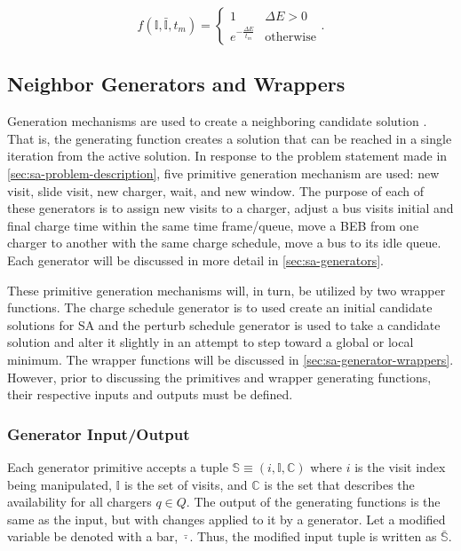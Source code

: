 \documentclass[energies,article,submit,moreauthors]{Definitions/mdpi}
\newcommand{\I}{\mathbb{I}}                 %
\newcommand{\C}{\mathbb{C}}                 %
\newcommand{\Sol}{\mathbb{S}}               %
\newcommand{\Qset}{Q}                       %
\begin{document}
\begin{equation}
\label{eq:candaccept}
f(\I,\bar{\I},t_m) =
\begin{cases}
  1                   & \Delta E > 0 \\
  e^{- \frac{\Delta E}{t_m}} & \text{otherwise}
\end{cases}\text{.}
\end{equation}

\subsection{Neighbor Generators and Wrappers}
\label{sec:sa-generation-mechanisms}
Generation mechanisms are used to create a neighboring candidate solution \cite{gendreau-2018-handb-metah}. That is,
the generating function creates a solution that can be reached in a single iteration from the active solution. In
response to the problem statement made in \ref{sec:sa-problem-description}, five primitive generation mechanism are used: new
visit, slide visit, new charger, wait, and new window. The purpose of each of these generators is to assign new visits
to a charger, adjust a bus visits initial and final charge time within the same time frame/queue, move a BEB from one
charger to another with the same charge schedule, move a bus to its idle queue. Each generator will be discussed in more
detail in \ref{sec:sa-generators}.

These primitive generation mechanisms will, in turn, be utilized by two wrapper functions. The charge schedule generator
is to used create an initial candidate solutions for SA and the perturb schedule generator is used to take a candidate
solution and alter it slightly in an attempt to step toward a global or local minimum. The wrapper functions will be
discussed in \ref{sec:sa-generator-wrappers}. However, prior to discussing the primitives and wrapper generating functions,
their respective inputs and outputs must be defined.

\subsubsection{Generator Input/Output}
\label{sec:sa-generator-input-output}
Each generator primitive accepts a tuple \(\Sol \equiv (i, \I, \C)\) where \(i\) is the visit index being manipulated, \(\I\) is
the set of visits, and \(\C\) is the set that describes the availability for all chargers \(q \in \Qset\). The output of the
generating functions is the same as the input, but with changes applied to it by a generator. Let a modified variable be
denoted with a bar, \(\bar{\cdot}\). Thus, the modified input tuple is written as \(\bar{\Sol}\).
\end{document}
